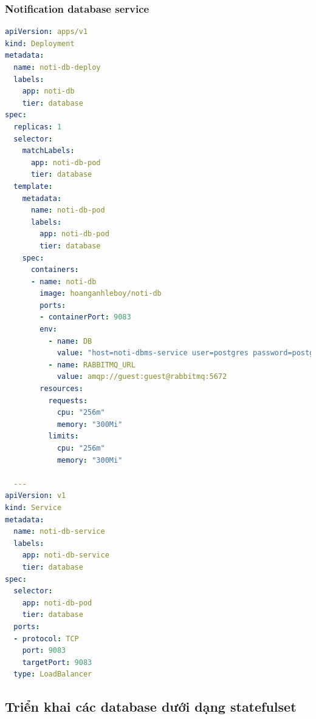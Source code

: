 \subsubsection*{Notification database service}
\begin{lstlisting}[language=yaml]
apiVersion: apps/v1
kind: Deployment
metadata:
  name: noti-db-deploy
  labels:
    app: noti-db
    tier: database
spec:
  replicas: 1
  selector:
    matchLabels:
      app: noti-db-pod
      tier: database
  template:
    metadata:
      name: noti-db-pod
      labels:
        app: noti-db-pod
        tier: database
    spec:
      containers:
      - name: noti-db
        image: hoanganhleboy/noti-db
        ports:
        - containerPort: 9083
        env:
          - name: DB
            value: "host=noti-dbms-service user=postgres password=postgres dbname=noti port=5432"
          - name: RABBITMQ_URL
            value: amqp://guest:guest@rabbitmq:5672
        resources:
          requests:
            cpu: "256m"
            memory: "300Mi"
          limits:
            cpu: "256m"
            memory: "300Mi"

  ---
apiVersion: v1
kind: Service
metadata:
  name: noti-db-service
  labels:
    app: noti-db-service
    tier: database
spec:
  selector:
    app: noti-db-pod
    tier: database
  ports:
  - protocol: TCP
    port: 9083
    targetPort: 9083
  type: LoadBalancer
\end{lstlisting}
\subsection{Triển khai các database dưới dạng statefulset}
